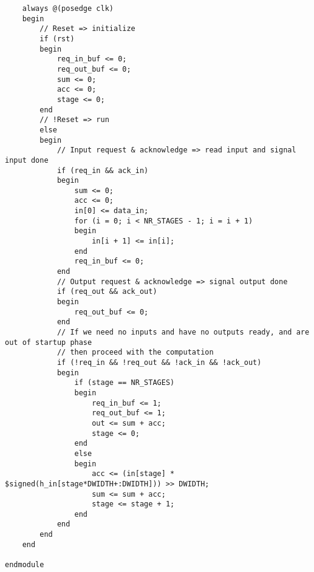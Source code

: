 \begin{verbatim}
    always @(posedge clk)
    begin
        // Reset => initialize
        if (rst)
        begin
            req_in_buf <= 0;
            req_out_buf <= 0;
            sum <= 0;
            acc <= 0;
            stage <= 0;
        end
        // !Reset => run
        else
        begin
            // Input request & acknowledge => read input and signal input done
            if (req_in && ack_in)
            begin
                sum <= 0;
                acc <= 0;
                in[0] <= data_in;
                for (i = 0; i < NR_STAGES - 1; i = i + 1)
                begin
                    in[i + 1] <= in[i];
                end
                req_in_buf <= 0;
            end
            // Output request & acknowledge => signal output done
            if (req_out && ack_out)
            begin
                req_out_buf <= 0;
            end
            // If we need no inputs and have no outputs ready, and are out of startup phase
            // then proceed with the computation
            if (!req_in && !req_out && !ack_in && !ack_out)
            begin   
                if (stage == NR_STAGES)
                begin
                    req_in_buf <= 1;
                    req_out_buf <= 1;
                    out <= sum + acc;
                    stage <= 0;
                end
                else
                begin
                    acc <= (in[stage] * $signed(h_in[stage*DWIDTH+:DWIDTH])) >> DWIDTH;
                    sum <= sum + acc;
                    stage <= stage + 1;
                end
            end
        end
    end

endmodule

\end{verbatim}
